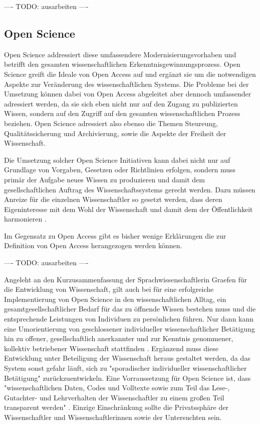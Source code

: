 ---- TODO: ausarbeiten ----

\subsection{Open Science}

Open Science addressiert diese umfassendere Modernisierungsvorhaben und betrifft den gesamten wissenschaftlichen Erkenntnisgewinnungsprozess. Open Science greift die Ideale von Open Access auf und ergänzt sie um die notwendigen Aspekte zur Veränderung des wissenschaftlichen Systems. Die Probleme bei der Umsetzung können dabei von Open Access abgeleitet aber dennoch umfassender adressiert werden, da sie sich eben nicht nur auf den Zugang zu publizierten Wissen, sondern auf den Zugriff auf den gesamten wissenschaftlichen Prozess beziehen. Open Science adressiert also ebenso die Themen Steureung, Qualitätssicherung und Archivierung, sowie die Aspekte der Freiheit der Wissenschaft.

Die Umsetzung solcher Open Science Initiativen kann dabei nicht nur auf Grundlage von Vorgaben, Gesetzen oder Richtlinien erfolgen, sondern muss primär der Aufgabe neues Wissen zu produzieren und damit dem gesellschaftlichen Auftrag des Wissenschaftssystems gerecht werden. Dazu müssen Anreize für die einzelnen Wissenschaftler so gesetzt werden, dass deren Eigeninteresse mit dem Wohl der Wissenschaft und damit dem der Öffentlichkeit harmonieren \cite{brembs2015open}.

Im Gegensatz zu Open Access gibt es bisher wenige Erklärungen die zur Definition von Open Access herangezogen werden können.

---- TODO: ausarbeiten ----

Angeleht an den Kurzusammenfassung der Sprachwissenschaftlerin Graefen für die Entwicklung von Wissenschaft, gilt auch bei für eine erfolgreiche Implementierung von Open Science in den wissenschaftlichen Alltag, ein gesamtgesellschaftlicher Bedarf für das zu öffnende Wissen bestehen muss und die entsprechende Leistungen von Individuen zu persönlichen führen. Nur dann kann eine Umorientierung von geschlossener individueller wissenschaftlicher Betätigung hin zu offener, gesellschaftlich anerkannter und zur Kenntnis genommener, kollektiv betriebener Wissenschaft stattfinden \cite{graefen2007_wissenschaftliche_artikel}. Ergänzend muss diese Entwicklung unter Beteiligung der Wissenschaft heraus gestaltet werden, da das System sonst gefahr läuft, sich zu "sporadischer individueller wissenschaftlicher Betätigung" \cite{graefen2007_wissenschaftliche_artikel} zurückzuentwickeln. Eine Vorraussetzung für Open Science ist, dass "wissenschaftlichen Daten, Codes und Volltexte sowie zum Teil das Lese-, Gutachter- und Lehrverhalten der Wissenschaftler zu einem großen Teil transparent werden" \cite{brembs2015open}. Einzige Einschränkung sollte die Privatssphäre der Wissenschaftler und Wissenschaftlerinnen sowie der Untersuchten sein.

